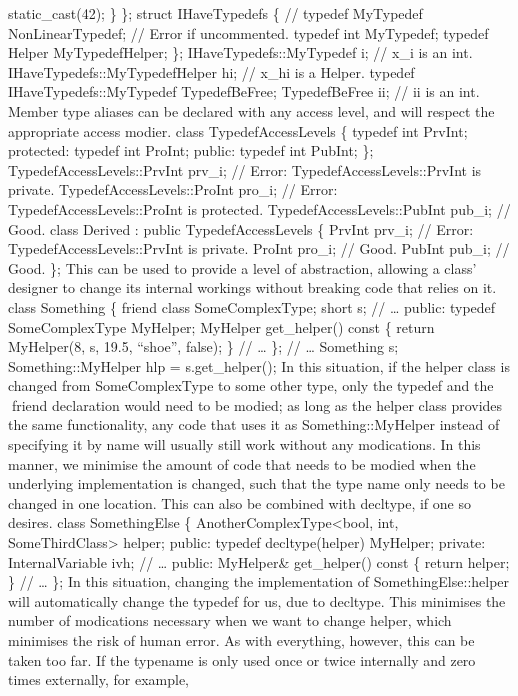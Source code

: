 static\_cast(42); \} \}; struct IHaveTypedefs \{ // typedef MyTypedef
NonLinearTypedef; // Error if uncommented. typedef int MyTypedef;
typedef Helper MyTypedefHelper; \}; IHaveTypedefs::MyTypedef i; // x\_i
is an int. IHaveTypedefs::MyTypedefHelper hi; // x\_hi is a Helper.
typedef IHaveTypedefs::MyTypedef TypedefBeFree; TypedefBeFree ii; // ii
is an int. Member type aliases can be declared with any access level,
and will respect the appropriate access modier. class
TypedefAccessLevels \{ typedef int PrvInt; protected: typedef int
ProInt; public: typedef int PubInt; \}; TypedefAccessLevels::PrvInt
prv\_i; // Error: TypedefAccessLevels::PrvInt is private.
TypedefAccessLevels::ProInt pro\_i; // Error:
TypedefAccessLevels::ProInt is protected. TypedefAccessLevels::PubInt
pub\_i; // Good. class Derived : public TypedefAccessLevels \{ PrvInt
prv\_i; // Error: TypedefAccessLevels::PrvInt is private. ProInt pro\_i;
// Good. PubInt pub\_i; // Good. \}; This can be used to provide a level
of abstraction, allowing a class' designer to change its internal
workings without breaking code that relies on it. class Something \{
friend class SomeComplexType; short s; // \ldots{} public: typedef
SomeComplexType MyHelper; MyHelper get\_helper() const \{ return
MyHelper(8, s, 19.5, ``shoe'', false); \} // \ldots{} \}; // \ldots{}
Something s; Something::MyHelper hlp = s.get\_helper(); In this
situation, if the helper class is changed from SomeComplexType to some
other type, only the typedef and the friend declaration would need to
be modied; as long as the helper class provides the same functionality,
any code that uses it as Something::MyHelper instead of specifying it by
name will usually still work without any modications. In this manner, we
minimise the amount of code that needs to be modied when the underlying
implementation is changed, such that the type name only needs to be
changed in one location. This can also be combined with decltype, if one
so desires. class SomethingElse \{ AnotherComplexType\textless bool,
int, SomeThirdClass\textgreater{} helper; public: typedef
decltype(helper) MyHelper; private: InternalVariable ivh; // \ldots{}
public: MyHelper\& get\_helper() const \{ return helper; \} // \ldots{}
\}; In this situation, changing the implementation of
SomethingElse::helper will automatically change the typedef for us, due
to decltype. This minimises the number of modications necessary when we
want to change helper, which minimises the risk of human error. As with
everything, however, this can be taken too far. If the typename is only
used once or twice internally and zero times externally, for example,

